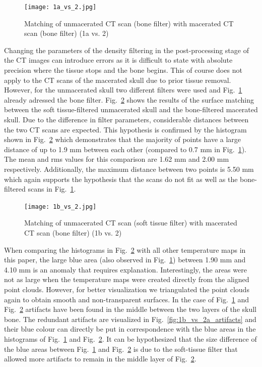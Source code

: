 \documentclass[a4paper]{article}
\begin{document}
\begin {figure} [ht!]
\centering
\texttt{[image: 1a\_vs\_2.jpg]}
\caption{\label{fig:1a_vs_2a}Matching of unmacerated CT scan (bone filter) with macerated CT scan (bone filter) (1a vs. 2)}
\end{figure}

Changing the parameters of the density filtering in the post-processing stage of the CT images can introduce errors as it is difficult to state with absolute precision where the tissue stops and the bone begins. This of course does not apply to the CT scans of the macerated skull due to prior tissue removal. However, for the unmacerated skull two different filters were used and Fig.~\ref{fig:1a_vs_2a} already adressed the bone filter. Fig.~\ref{fig:1b_vs_2a} shows the results of the surface matching between the soft tissue-filtered unmacerated skull and the bone-filtered macerated skull. Due to the difference in filter parameters, considerable distances between the two CT scans are expected. This hypothesis is confirmed by the histogram shown in Fig.~\ref{fig:1b_vs_2a} which demonstrates that the majority of points have a large distance of up to 1.9 mm between each other (compared to 0.7 mm in Fig.~\ref{fig:1a_vs_2a}). The mean and rms values for this comparison are 1.62 mm and 2.00 mm respectively. Additionally, the maximum distance between two points is 5.50 mm which again supports the hypothesis that the scans do not fit as well as the bone-filtered scans in Fig.~\ref{fig:1a_vs_2a}.

\begin {figure} [ht!]
\centering
\texttt{[image: 1b\_vs\_2.jpg]}
\caption{\label{fig:1b_vs_2a}Matching of unmacerated CT scan (soft tissue filter) with macerated CT scan (bone filter) (1b vs. 2)}
\end{figure}
\pagebreak
When comparing the histograms in Fig.~\ref{fig:1b_vs_2a} with all other temperature maps in this paper, the large blue area (also observed in Fig.~\ref{fig:1a_vs_2a}) between 1.90 mm and 4.10 mm is an anomaly that requires explanation. Interestingly, the areas were not as large when the temperature maps were created directly from the aligned point clouds. However, for better visualization we triangulated the point clouds again to obtain smooth and non-transparent surfaces. In the case of Fig.~\ref{fig:1a_vs_2a} and Fig.~\ref{fig:1b_vs_2a} artifacts have been found in the middle between the two layers of the skull bone. The redundant artifacts are visualized in Fig.~\ref{fig:1b_vs_2a_artifacts} and their blue colour can directly be put in correspondence with the blue areas in the histograms of Fig.~\ref{fig:1a_vs_2a} and Fig.~\ref{fig:1b_vs_2a}. It can be hypothesized that the size difference of the blue areas between Fig.~\ref{fig:1a_vs_2a} and Fig.~\ref{fig:1b_vs_2a} is due to the soft-tissue filter that allowed more artifacts to remain in the middle layer of Fig.~\ref{fig:1b_vs_2a}. 
\end{document}
